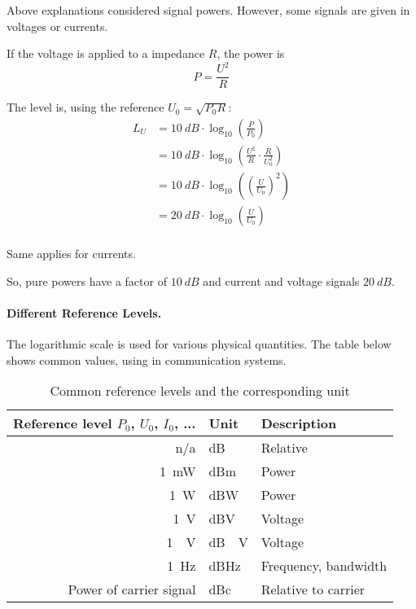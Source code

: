 \begin{refsection}
Above explanations considered signal powers. However, some signals are given in voltages or currents.

If the voltage is applied to a impedance $R$, the power is
\begin{equation}
	P = \frac{U^2}{R}
\end{equation}

The level is, using the reference $U_0 = \sqrt{P_0 R}$:
\begin{equation}
	\begin{split}
		L_U &= \SI{10}{dB} \cdot \log_{10} \left(\frac{P}{P_0}\right) \\
		 &= \SI{10}{dB} \cdot \log_{10} \left(\frac{U^2}{R} \cdot \frac{R}{U_0^2}\right) \\
		 &= \SI{10}{dB} \cdot \log_{10} \left(\left(\frac{U}{U_0}\right)^2\right) \\
		 &= \SI{20}{dB} \cdot \log_{10} \left(\frac{U}{U_0}\right) \\
	\end{split}
\end{equation}

Same applies for currents.

So, pure powers have a factor of $\SI{10}{dB}$ and current and voltage signals $\SI{20}{dB}$.

\paragraph{Different Reference Levels.}

The logarithmic scale is used for various physical quantities. The table below shows common values, using in communication systems.

\begin{table}[H]
	\centering
	\caption{Common reference levels and the corresponding unit}
	\begin{tabular}{|r|l|l|}
		\hline
		Reference level $P_0$, $U_0$, $I_0$, ... & Unit & Description \\
		\hline
		\hline
		n/a & \si{dB} & Relative \\
		\hline
		\SI{1}{mW} & \si{dBm} & Power \\
		\hline
		\SI{1}{W} & \si{dBW} & Power \\
		\hline
		\SI{1}{V} & \si{dBV} & Voltage \\
		\hline
		\SI{1}{\micro.V} & \si{dB\micro.V} & Voltage \\
		\hline
		\SI{1}{Hz} & \si{dBHz} & Frequency, bandwidth \\
		\hline
		Power of carrier signal & \si{dBc} & Relative to carrier \\
		\hline
	\end{tabular}
\end{table}


\end{refsection}
